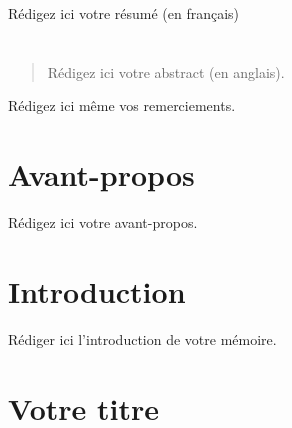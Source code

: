 \documentclass[12pt]{ulaval}
\date{Mois Année}
\begin{document}
  \maketitle

\frontmatter %
\pagestyle{plain} %
\setcounter{page}{2}
  \begin{resume}
    Rédigez ici votre résumé (en français)

    \hypertarget{section-1}{%
    \chapter*{}\label{section-1}}
  \end{resume}
  \begin{abstract}
    Rédigez ici votre abstract (en anglais).
  \end{abstract}
% 
  \hypersetup{linkcolor=black}
   \setcounter{tocdepth}{2}
  \tableofcontents


  \listoffigures
  \begin{remerciements}
    Rédigez ici même vos remerciements.

    \hypertarget{section}{%
    \chapter*{}\label{section}}

    \hypertarget{avant-propos}{%
    \chapter{Avant-propos}\label{avant-propos}}

    Rédigez ici votre avant-propos.
  \end{remerciements}
% 
\mainmatter %
\pagestyle{fancyplain} %

\doublespace

\hypertarget{introduction}{%
\chapter*{Introduction}\label{introduction}}

Rédiger ici l'introduction de votre mémoire.

\hypertarget{votre-titre}{%
\chapter{Votre titre}\label{votre-titre}}
\end{document}
